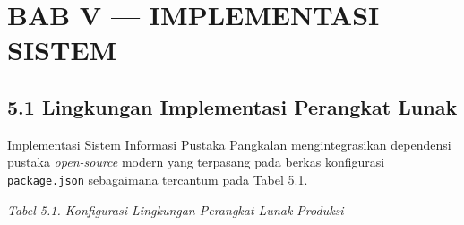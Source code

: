 \documentclass[
  indonesian,
  12pt,
]{report}
\begin{document}
\newpage

\chapter{BAB V --- IMPLEMENTASI SISTEM}\label{bab-v-implementasi-sistem}

\section{5.1 Lingkungan Implementasi Perangkat
Lunak}\label{lingkungan-implementasi-perangkat-lunak}

Implementasi Sistem Informasi Pustaka Pangkalan mengintegrasikan
dependensi pustaka \emph{open-source} modern yang terpasang pada berkas
konfigurasi \texttt{package.json} sebagaimana tercantum pada Tabel 5.1.

\emph{Tabel 5.1. Konfigurasi Lingkungan Perangkat Lunak Produksi}
\end{document}
